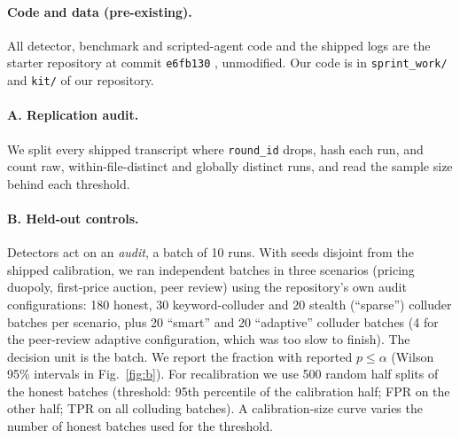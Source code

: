 \documentclass[10pt]{article}
\begin{document}
\paragraph{Code and data (pre-existing).} All detector, benchmark and scripted-agent code and the shipped logs are the starter repository at commit \texttt{e6fb130} \cite{starter}, unmodified. Our code is in \texttt{sprint\_work/} and \texttt{kit/} of our repository.

\paragraph{A. Replication audit.} We split every shipped transcript where \texttt{round\_id} drops, hash each run, and count raw, within-file-distinct and globally distinct runs, and read the sample size behind each threshold.

\paragraph{B. Held-out controls.} Detectors act on an \emph{audit}, a batch of 10 runs. With seeds disjoint from the shipped calibration, we ran independent batches in three scenarios (pricing duopoly, first-price auction, peer review) using the repository's own audit configurations: 180 honest, 30 keyword-colluder and 20 stealth (``sparse'') colluder batches per scenario, plus 20 ``smart'' and 20 ``adaptive'' colluder batches (4 for the peer-review adaptive configuration, which was too slow to finish). The decision unit is the batch. We report the fraction with reported $p\le\alpha$ (Wilson 95\% intervals in Fig.~\ref{fig:b}). For recalibration we use 500 random half splits of the honest batches (threshold: 95th percentile of the calibration half; FPR on the other half; TPR on all colluding batches). A calibration-size curve varies the number of honest batches used for the threshold.
\end{document}

